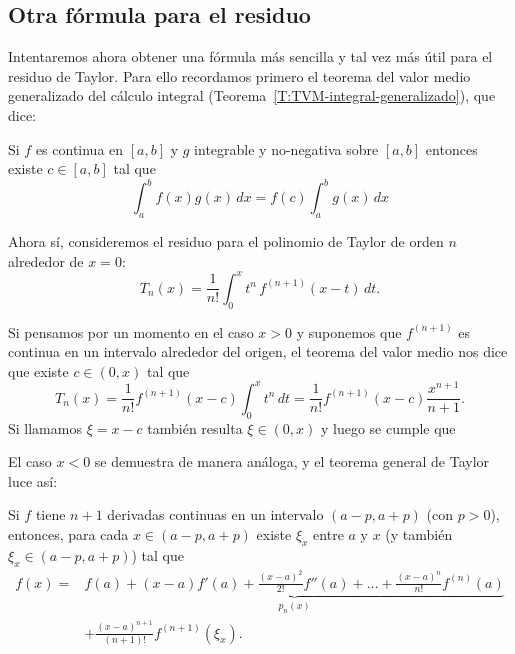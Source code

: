 
\subsection{Otra fórmula para el residuo}

Intentaremos ahora obtener una fórmula más sencilla y tal vez más útil para el residuo de Taylor. Para ello recordamos primero el teorema del valor medio generalizado del cálculo integral (Teorema~\ref{T:TVM-integral-generalizado}), que dice:

\begin{theorem}
 Si $f$ es continua en $[a,b]$ y $g$ integrable y no-negativa sobre $[a,b]$ entonces existe $c \in [a,b]$ tal que 
\[
 \int_a^b f(x) g(x) \, dx = f(c) \int_a^b g(x)\, dx
\]
\end{theorem}

Ahora sí, consideremos el residuo para el polinomio de Taylor de orden $n$ alrededor de $x=0$:
\[
 T_n(x) = \frac{1}{n!} \int_0^x t^n \, f^{(n+1)}(x-t)\, dt.
\]

Si pensamos por un momento en el caso $x > 0$ y suponemos que $f^{(n+1)}$ es continua en un intervalo alrededor del origen, el teorema del valor medio nos dice que existe $c \in (0,x)$ tal que 
\[
 T_n(x) = \frac{1}{n!} f^{(n+1)}(x - c) \int_0^x t^n \, dt = \frac{1}{n!} f^{(n+1)}(x - c) \frac{x^{n+1}}{n+1}. 
\]
Si llamamos $\xi = x - c$ también resulta $\xi \in (0,x)$ y luego se cumple que

\recuadro{
\[
 T_n(x) = \frac{x^{n+1}}{(n+1)!} f^{(n+1)}(\xi),\qquad\text{para algún $\xi$ entre $0$ y $x$}.
\]
}

El caso $x<0$ se demuestra de manera análoga, y el teorema general de Taylor luce así:

\begin{theorem}
 Si $f$ tiene $n+1$ derivadas continuas en un intervalo $(a-p,a+p)$  (con $p > 0$), entonces, para cada $x \in (a-p,a+p)$ existe $\xi_x$ entre $a$ y $x$ (y también $\xi_x \in (a-p,a+p)$) tal que
\begin{align*}
  f(x) ={}& \underbrace{f(a) + (x-a) f'(a) + \frac{(x-a)^2}{2!} f''(a) %
  + \dots 
   +\frac{(x-a)^n}{n!} f^{(n)}(a) }_{p_n(x)}
   \\
   &+ \frac{(x-a)^{n+1}}{(n+1)!} f^{(n+1)}(\xi_x).
\end{align*}
\end{theorem}

